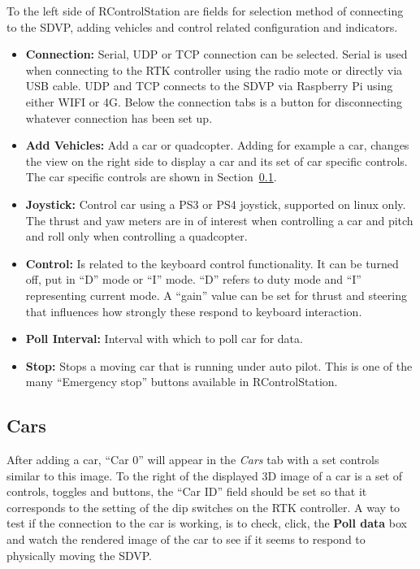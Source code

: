 \documentclass[12pt]{article} %
\begin{document}
\begin{minipage}{0.2\textwidth}
\end{minipage}
\begin{minipage}{0.7\textwidth}
  To the left side of RControlStation are fields for selection method of connecting to the
  SDVP, adding vehicles and control related configuration and indicators.  
  \begin{itemize}
  \item {\bf Connection:} Serial, UDP or TCP connection can be
    selected. Serial is used when connecting to the RTK controller
    using the radio mote or directly via USB cable. UDP and TCP
    connects to the SDVP via Raspberry Pi using either WIFI or 4G.
    Below the connection tabs is a button for disconnecting whatever
    connection has been set up. 
  \item {\bf Add Vehicles:} Add a car or quadcopter. Adding for
    example a car, changes the view on the right side to display a car
    and its set of car specific controls. The car specific controls are
    shown in Section~\ref{sec:cars}. %
  \item {\bf Joystick:} Control car using a PS3 or PS4 joystick, supported on linux only.
    The thrust and yaw meters are in of interest when controlling a car and pitch and roll
    only when controlling a quadcopter.
  \item {\bf Control:} Is related to the keyboard control
    functionality. It can be turned off, put in ``D'' mode or ``I''
    mode. ``D'' refers to duty mode and ``I'' representing current
    mode.  A ``gain'' value can be set for thrust and steering that
    influences how strongly these respond to keyboard interaction.
  \item {\bf Poll Interval:} Interval with which to poll car for data. 
  \item {\bf Stop:} Stops a moving car that is running under auto pilot. This
    is one of the many ``Emergency stop'' buttons available in RControlStation. 
  \end{itemize} 
\end{minipage}


\subsection{Cars}
\label{sec:cars}


  After adding a car, ``Car 0'' will appear in the {\em Cars} tab with
  a set controls similar to this image.  To the right of the displayed
  3D image of a car is a set of controls, toggles and buttons, the
  ``Car ID'' field should be set so that it corresponds to the setting
  of the dip switches on the RTK controller. A way to test if the
  connection to the car is working, is to check, click, the {\bf Poll data}
  box and watch the rendered image of the car to see if it seems to respond
  to physically moving the SDVP.
\end{document}
